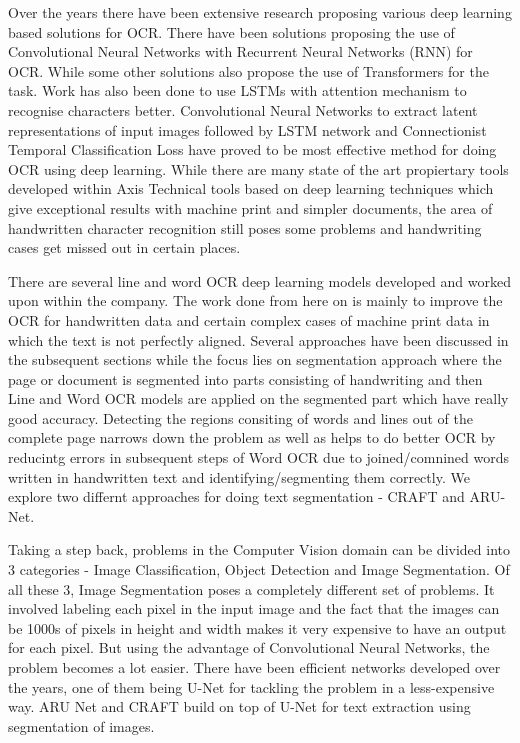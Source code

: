 Over the years there have been extensive research proposing various deep learning based solutions for OCR. There have been solutions proposing the use of Convolutional Neural Networks with Recurrent Neural Networks (RNN) for OCR. While some other solutions also propose the use of Transformers for the task. Work has also been done to use LSTMs with attention mechanism to recognise characters better. Convolutional Neural Networks to extract latent representations of input images followed by LSTM network and Connectionist Temporal Classification Loss have proved to be most effective method for doing OCR using deep learning. While there are many state of the art propiertary tools developed within Axis Technical tools based on deep learning techniques which give exceptional results with machine print and simpler documents, the area of handwritten character recognition still poses some problems and handwriting cases get missed out in certain places.

There are several line and word OCR deep learning models developed and worked upon within the company. The work done from here on is mainly to improve the OCR for handwritten data and certain complex cases of machine print data in which the text is not perfectly aligned. Several approaches have been discussed in the subsequent sections while the focus lies on segmentation approach where the page or document is segmented into parts consisting of handwriting and then Line and Word OCR models are applied on the segmented part which have really good accuracy. Detecting the regions consiting of words and lines out of the complete page narrows down the problem as well as helps to do better OCR by reducintg errors in subsequent steps of Word OCR due to joined/comnined words written in handwritten text and identifying/segmenting them correctly. We explore two differnt approaches for doing text segmentation - CRAFT and ARU-Net.

Taking a step back, problems in the Computer Vision domain can be divided into 3 categories - Image Classification, Object Detection and Image Segmentation. Of all these 3, Image Segmentation poses a completely different set of problems. It involved labeling each pixel in the input image and the fact that the images can be 1000s of pixels in height and width makes it very expensive to have an output for each pixel. But using the advantage of Convolutional Neural Networks, the problem becomes a lot easier. There have been efficient networks developed over the years, one of them being U-Net for tackling the problem in a less-expensive way. ARU Net and CRAFT build on top of U-Net for text extraction using segmentation of images.

